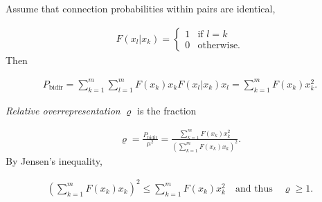 \begin{frame}{}
  Assume that connection probabilities within pairs are identical,
  
\begin{align*}
  F(x_l | x_k) = \begin{cases} 1 & \text{if $l = k$} \\ 0 & \text{otherwise.} \end{cases}
\end{align*}
Then

\begin{align*}
  P_{\text{bidir}} = \sum_{k=1}^m \sum_{l=1}^m F(x_k) x_k F(x_l | x_k) x_l = \sum_{k=1}^m F(x_k) x_k^2 .
\end{align*}

\vspace{0.4cm}

\textit{Relative overrepresentation} $\varrho$ is the fraction

\begin{align*}
  \varrho = \frac{P_{\text{bidir}}}{\mu^2} = \frac{\sum_{k=1}^m F(x_k) x_k^2 }{\left(\sum_{k=1}^m F(x_k) x_k\right)^2}.
\end{align*}
By Jensen's inequality,

\begin{align*}
  \left(\sum_{k=1}^m F(x_k) x_k\right)^2 \leq \sum_{k=1}^m F(x_k) x_k^2  \quad \text{and thus} \quad \varrho \geq 1.
\end{align*}	

\end{frame}
